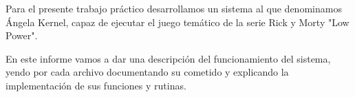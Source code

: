 Para el presente trabajo práctico desarrollamos un sistema al que denominamos Ángela Kernel, capaz de ejecutar
el juego temático de la serie Rick y Morty "Low Power".

En este informe vamos a dar una descripción del funcionamiento del sistema, yendo por cada archivo documentando su cometido y explicando 
la implementación de sus funciones y rutinas.